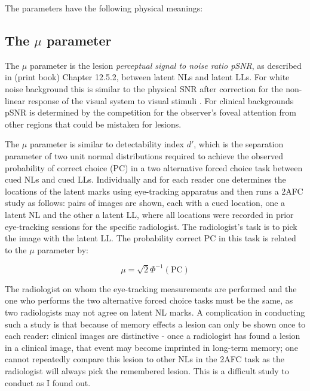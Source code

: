 \documentclass[
]{book}
\begin{document}
The parameters have the following physical meanings:

\hypertarget{rsm-mu-parameter}{%
\subsection{\texorpdfstring{The \(\mu\) parameter}{The \textbackslash mu parameter}}\label{rsm-mu-parameter}}

The \(\mu\) parameter is the lesion \emph{perceptual signal to noise ratio pSNR}, as described in (print book) Chapter 12.5.2, between latent NLs and latent LLs. For white noise background this is similar to the physical SNR \citep{chakraborty1997computer} after correction for the non-linear response of the visual system to visual stimuli \citep{siddiqui2005discrete}. For clinical backgrounds pSNR is determined by the competition for the observer's foveal attention from other regions that could be mistaken for lesions.

The \(\mu\) parameter is similar to detectability index \(d'\), which is the separation parameter of two unit normal distributions required to achieve the observed probability of correct choice (PC) in a two alternative forced choice task between cued NLs and cued LLs. Individually and for each reader one determines the locations of the latent marks using eye-tracking apparatus and then runs a 2AFC study as follows: pairs of images are shown, each with a cued location, one a latent NL and the other a latent LL, where all locations were recorded in prior eye-tracking sessions for the specific radiologist. The radiologist's task is to pick the image with the latent LL. The probability correct \(\text{PC}\) in this task is related to the \(\mu\) parameter by:

\begin{equation} 
\mu = \sqrt{2} \Phi^{-1} \left ( \text{PC} \right )
\label{eq:rsm-mu-2afc}
\end{equation}

The radiologist on whom the eye-tracking measurements are performed and the one who performs the two alternative forced choice tasks must be the same, as two radiologists may not agree on latent NL marks. A complication in conducting such a study is that because of memory effects a lesion can only be shown once to each reader: clinical images are distinctive - once a radiologist has found a lesion in a clinical image, that event may become imprinted in long-term memory; one cannot repeatedly compare this lesion to other NLs in the 2AFC task as the radiologist will always pick the remembered lesion. This is a difficult study to conduct as I found out.
\end{document}
